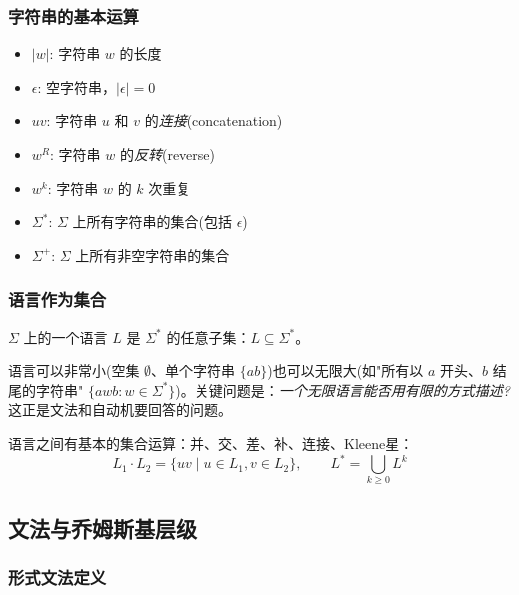 \subsubsection{字符串的基本运算}

\begin{itemize}
    \item $|w|$: 字符串 $w$ 的长度
    \item $\epsilon$: 空字符串，$|\epsilon| = 0$
    \item $uv$: 字符串 $u$ 和 $v$ 的\emph{连接}(concatenation)
    \item $w^R$: 字符串 $w$ 的\emph{反转}(reverse)
    \item $w^k$: 字符串 $w$ 的 $k$ 次重复
    \item $\Sigma^*$: $\Sigma$ 上所有字符串的集合(包括 $\epsilon$)
    \item $\Sigma^+$: $\Sigma$ 上所有非空字符串的集合
\end{itemize}

\subsubsection{语言作为集合}

\begin{definition}[语言]
$\Sigma$ 上的一个语言 $L$ 是 $\Sigma^*$ 的任意子集：$L \subseteq \Sigma^*$。
\end{definition}

语言可以非常小(空集 $\emptyset$、单个字符串 $\{ab\}$)也可以无限大(如"所有以 $a$ 开头、$b$ 结尾的字符串" $\{awb : w \in \Sigma^*\}$)。关键问题是：\emph{一个无限语言能否用有限的方式描述?} 这正是文法和自动机要回答的问题。

语言之间有基本的集合运算：并、交、差、补、连接、Kleene星：
\begin{equation}
    L_1 \cdot L_2 = \{ uv \mid u \in L_1, v \in L_2 \}, \qquad L^* = \bigcup_{k \geq 0} L^k
\end{equation}

\subsection{文法与乔姆斯基层级}

\subsubsection{形式文法定义}

